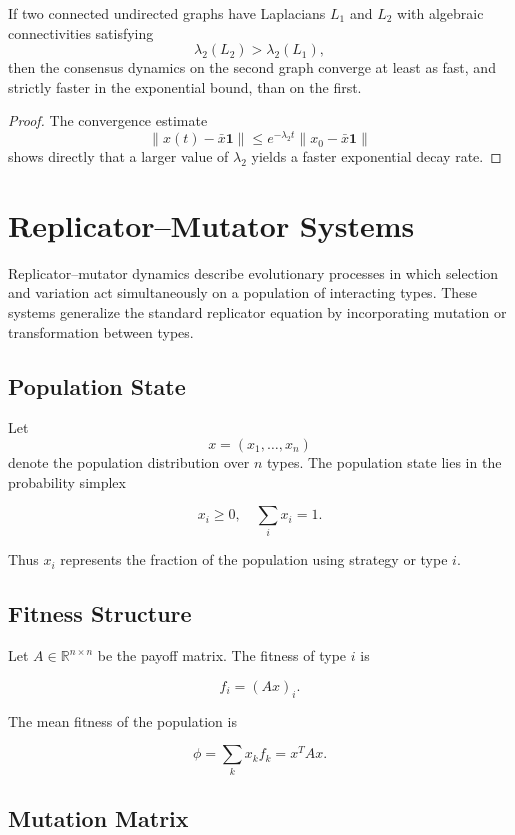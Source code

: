 \documentclass[12pt]{article}
\begin{document}
\begin{corollary}
If two connected undirected graphs have Laplacians $L_1$ and $L_2$ with algebraic connectivities satisfying
\[
\lambda_2(L_2) > \lambda_2(L_1),
\]
then the consensus dynamics on the second graph converge at least as fast, and strictly faster in the exponential bound, than on the first.
\end{corollary}

\begin{proof}
The convergence estimate
\[
\|x(t)-\bar{x}\mathbf{1}\|
\le
e^{-\lambda_2 t}\|x_0-\bar{x}\mathbf{1}\|
\]
shows directly that a larger value of $\lambda_2$ yields a faster exponential decay rate.
\end{proof}

\section{Replicator--Mutator Systems}

Replicator--mutator dynamics describe evolutionary processes in which selection and variation act simultaneously on a population of interacting types. These systems generalize the standard replicator equation by incorporating mutation or transformation between types.

\subsection{Population State}

Let
\[
x = (x_1,\dots,x_n)
\]
denote the population distribution over $n$ types. The population state lies in the probability simplex

\[
x_i \ge 0, \quad \sum_i x_i = 1.
\]

Thus $x_i$ represents the fraction of the population using strategy or type $i$.

\subsection{Fitness Structure}

Let $A \in \mathbb{R}^{n\times n}$ be the payoff matrix. The fitness of type $i$ is

\[
f_i = (Ax)_i .
\]

The mean fitness of the population is

\[
\phi = \sum_k x_k f_k = x^T A x .
\]

\subsection{Mutation Matrix}
\end{document}
